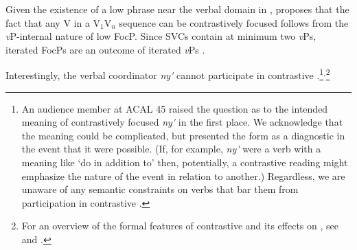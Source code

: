 \documentclass[output=paper]{../langsci/langscibook}
\begin{document}
\ea\label{ex:duncan-et-al:7}
\z
\z

\noindent Given the existence of a low  phrase near the verbal domain in  \citep{duncan-toappear}, \citet{duncan2016parallel} proposes that the fact that any V in a V$_1$V$_n$ sequence can be contrastively focused follows from the \textit{v}P-internal nature of low FocP. Since SVCs contain at minimum two \textit{v}Ps, iterated FocPs are an outcome of iterated \textit{v}Ps \citep[98-100]{duncan2016parallel}. 

Interestingly, the verbal coordinator \textit{ny\'{\textturnv}\ng} cannot participate in contrastive .\footnote{An audience member at ACAL 45 raised the question as to the intended meaning of contrastively focused \textit{ny\'{\textturnv}\ng} in the first place. We acknowledge that the meaning could be complicated, but presented the form as a diagnostic in the event that it were possible. (If, for example, \textit{ny\'{\textturnv}\ng} were a verb with a meaning like `do in addition to' then, potentially, a contrastive  reading might emphasize the nature of the event in relation to another.) Regardless, we are unaware of any semantic constraints on verbs that bar them from participation in contrastive .}$^,$\footnote{For an overview of the formal features of  contrastive  and its effects on , see \citet{akinlabi2003} and \citet{duncan-toappear}.}
\end{document}
